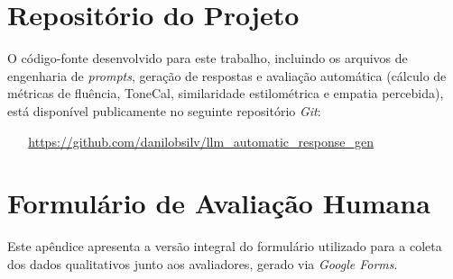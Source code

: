 \documentclass[12pt, a4paper]{article}
\numberwithin{equation}{section}
\begin{document}
\newpage
\providecommand*{\refname}{}
\renewcommand*{\refname}{\begin{center}\textit{REFERÊNCIAS}\end{center}}
\newpage
\pagestyle{empty}
\pagestyle{myheadings}

%






\newpage
\appendix %
\renewcommand{\thesection}{\Alph{section}}
\section{Repositório do Projeto}
\label{apendice:repositorio}

O código-fonte desenvolvido para este trabalho, incluindo os arquivos de engenharia de \textit{prompts}, geração de respostas e avaliação automática (cálculo de métricas de fluência, ToneCal, similaridade estilométrica e empatia percebida), está disponível publicamente no seguinte repositório \textit{Git}:

\begin{center}
    \url{https://github.com/danilobsilv/llm_automatic_response_gen}
\end{center}

\section{Formulário de Avaliação Humana}
\label{apendice:formulario_completo}

Este apêndice apresenta a versão integral do formulário utilizado para a coleta dos dados qualitativos junto aos avaliadores, gerado via \textit{Google Forms}.




\end{document}
